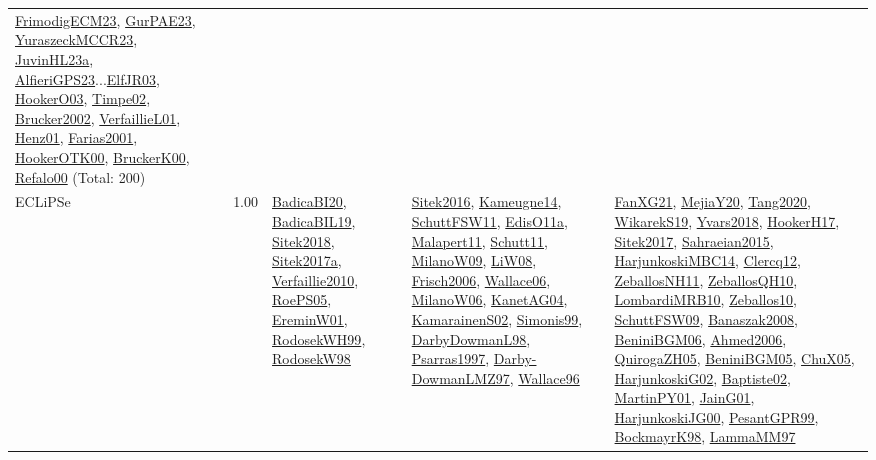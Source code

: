 {\begin{longtable}{p{3cm}r>{\raggedright\arraybackslash}p{6cm}>{\raggedright\arraybackslash}p{6cm}>{\raggedright\arraybackslash}p{8cm}}
\hyperref[detail:FrimodigECM23]{FrimodigECM23}, \hyperref[detail:GurPAE23]{GurPAE23}, \hyperref[detail:YuraszeckMCCR23]{YuraszeckMCCR23}, \hyperref[detail:JuvinHL23a]{JuvinHL23a}, \hyperref[detail:AlfieriGPS23]{AlfieriGPS23}...\hyperref[detail:ElfJR03]{ElfJR03}, \hyperref[detail:HookerO03]{HookerO03}, \hyperref[detail:Timpe02]{Timpe02}, \hyperref[detail:Brucker2002]{Brucker2002}, \hyperref[detail:VerfaillieL01]{VerfaillieL01}, \hyperref[detail:Henz01]{Henz01}, \hyperref[detail:Farias2001]{Farias2001}, \hyperref[detail:HookerOTK00]{HookerOTK00}, \hyperref[detail:BruckerK00]{BruckerK00}, \hyperref[detail:Refalo00]{Refalo00} (Total: 200)\\
\index{ECLiPSe}\index{CPSystems!ECLiPSe}ECLiPSe &  1.00 & \hyperref[detail:BadicaBI20]{BadicaBI20}, \hyperref[detail:BadicaBIL19]{BadicaBIL19}, \hyperref[detail:Sitek2018]{Sitek2018}, \hyperref[detail:Sitek2017a]{Sitek2017a}, \hyperref[detail:Verfaillie2010]{Verfaillie2010}, \hyperref[detail:RoePS05]{RoePS05}, \hyperref[detail:EreminW01]{EreminW01}, \hyperref[detail:RodosekWH99]{RodosekWH99}, \hyperref[detail:RodosekW98]{RodosekW98} & \hyperref[detail:Sitek2016]{Sitek2016}, \hyperref[detail:Kameugne14]{Kameugne14}, \hyperref[detail:SchuttFSW11]{SchuttFSW11}, \hyperref[detail:EdisO11a]{EdisO11a}, \hyperref[detail:Malapert11]{Malapert11}, \hyperref[detail:Schutt11]{Schutt11}, \hyperref[detail:MilanoW09]{MilanoW09}, \hyperref[detail:LiW08]{LiW08}, \hyperref[detail:Frisch2006]{Frisch2006}, \hyperref[detail:Wallace06]{Wallace06}, \hyperref[detail:MilanoW06]{MilanoW06}, \hyperref[detail:KanetAG04]{KanetAG04}, \hyperref[detail:KamarainenS02]{KamarainenS02}, \hyperref[detail:Simonis99]{Simonis99}, \hyperref[detail:DarbyDowmanL98]{DarbyDowmanL98}, \hyperref[detail:Psarras1997]{Psarras1997}, \hyperref[detail:Darby-DowmanLMZ97]{Darby-DowmanLMZ97}, \hyperref[detail:Wallace96]{Wallace96} & \hyperref[detail:FanXG21]{FanXG21}, \hyperref[detail:MejiaY20]{MejiaY20}, \hyperref[detail:Tang2020]{Tang2020}, \hyperref[detail:WikarekS19]{WikarekS19}, \hyperref[detail:Yvars2018]{Yvars2018}, \hyperref[detail:HookerH17]{HookerH17}, \hyperref[detail:Sitek2017]{Sitek2017}, \hyperref[detail:Sahraeian2015]{Sahraeian2015}, \hyperref[detail:HarjunkoskiMBC14]{HarjunkoskiMBC14}, \hyperref[detail:Clercq12]{Clercq12}, \hyperref[detail:ZeballosNH11]{ZeballosNH11}, \hyperref[detail:ZeballosQH10]{ZeballosQH10}, \hyperref[detail:LombardiMRB10]{LombardiMRB10}, \hyperref[detail:Zeballos10]{Zeballos10}, \hyperref[detail:SchuttFSW09]{SchuttFSW09}, \hyperref[detail:Banaszak2008]{Banaszak2008}, \hyperref[detail:BeniniBGM06]{BeniniBGM06}, \hyperref[detail:Ahmed2006]{Ahmed2006}, \hyperref[detail:QuirogaZH05]{QuirogaZH05}, \hyperref[detail:BeniniBGM05]{BeniniBGM05}, \hyperref[detail:ChuX05]{ChuX05}, \hyperref[detail:HarjunkoskiG02]{HarjunkoskiG02}, \hyperref[detail:Baptiste02]{Baptiste02}, \hyperref[detail:MartinPY01]{MartinPY01}, \hyperref[detail:JainG01]{JainG01}, \hyperref[detail:HarjunkoskiJG00]{HarjunkoskiJG00}, \hyperref[detail:PesantGPR99]{PesantGPR99}, \hyperref[detail:BockmayrK98]{BockmayrK98}, \hyperref[detail:LammaMM97]{LammaMM97}\\

\end{longtable}}
